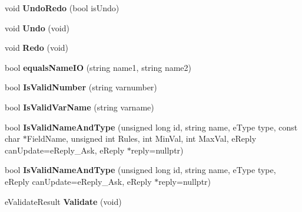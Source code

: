 \begin{DoxyCompactItemize}
\item 
\hypertarget{class_ladder_diagram_a26978bff8ef3e68ffcbd1f6ca835caf1}{void {\bfseries Undo\-Redo} (bool is\-Undo)}\label{class_ladder_diagram_a26978bff8ef3e68ffcbd1f6ca835caf1}

\item 
\hypertarget{class_ladder_diagram_aad8c95096b45cbd496b22e8617bb02ec}{void {\bfseries Undo} (void)}\label{class_ladder_diagram_aad8c95096b45cbd496b22e8617bb02ec}

\item 
\hypertarget{class_ladder_diagram_a2a05d67ea85c2f1d15c2bf5a804b907c}{void {\bfseries Redo} (void)}\label{class_ladder_diagram_a2a05d67ea85c2f1d15c2bf5a804b907c}

\item 
\hypertarget{class_ladder_diagram_ad99232bf5443fc063431de0d56dafbc6}{bool {\bfseries equals\-Name\-I\-O} (string name1, string name2)}\label{class_ladder_diagram_ad99232bf5443fc063431de0d56dafbc6}

\item 
\hypertarget{class_ladder_diagram_ad3763da6d0983e2583f81f0198d3935a}{bool {\bfseries Is\-Valid\-Number} (string varnumber)}\label{class_ladder_diagram_ad3763da6d0983e2583f81f0198d3935a}

\item 
\hypertarget{class_ladder_diagram_ad3f6d493c2fedea83ed9b0cc19de3244}{bool {\bfseries Is\-Valid\-Var\-Name} (string varname)}\label{class_ladder_diagram_ad3f6d493c2fedea83ed9b0cc19de3244}

\item 
\hypertarget{class_ladder_diagram_a6ae85bf3edc8af7eb0cf8f32bac0e082}{bool {\bfseries Is\-Valid\-Name\-And\-Type} (unsigned long id, string name, e\-Type type, const char $\ast$Field\-Name, unsigned int Rules, int Min\-Val, int Max\-Val, e\-Reply can\-Update=e\-Reply\-\_\-\-Ask, e\-Reply $\ast$reply=nullptr)}\label{class_ladder_diagram_a6ae85bf3edc8af7eb0cf8f32bac0e082}

\item 
\hypertarget{class_ladder_diagram_afa956867a08ec3ddd02b2a2e848b60a0}{bool {\bfseries Is\-Valid\-Name\-And\-Type} (unsigned long id, string name, e\-Type type, e\-Reply can\-Update=e\-Reply\-\_\-\-Ask, e\-Reply $\ast$reply=nullptr)}\label{class_ladder_diagram_afa956867a08ec3ddd02b2a2e848b60a0}

\item 
\hypertarget{class_ladder_diagram_a862f677a8ebab19b8678119b38a74211}{e\-Validate\-Result {\bfseries Validate} (void)}\label{class_ladder_diagram_a862f677a8ebab19b8678119b38a74211}


\end{DoxyCompactItemize}
